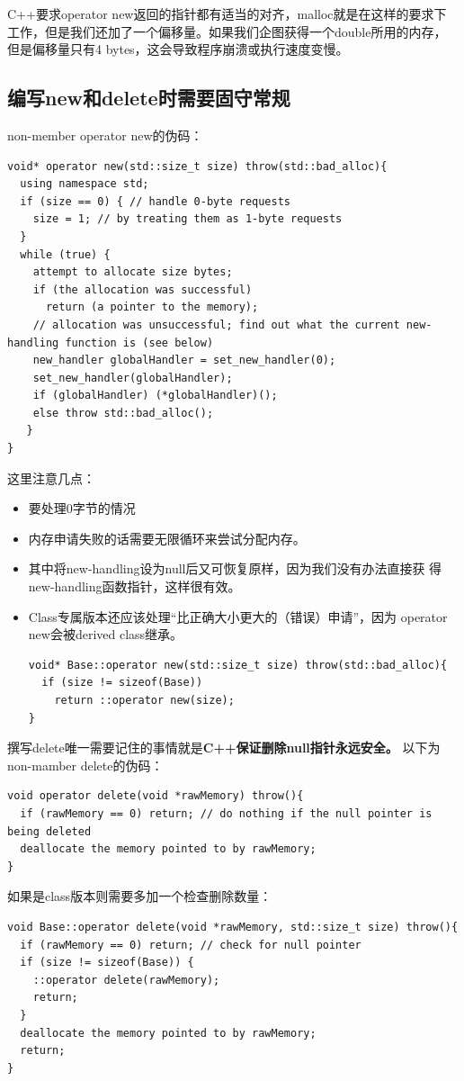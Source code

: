 \documentclass[a4paper,twoside]{article}
\theoremstyle{definition}
\theoremstyle{remark}
\numberwithin{equation}{section}
\begin{document}
C++要求operator new返回的指针都有适当的对齐，malloc就是在这样的要求下
工作，但是我们还加了一个偏移量。如果我们企图获得一个double所用的内存，
但是偏移量只有4 bytes，这会导致程序崩溃或执行速度变慢。

\subsection{编写new和delete时需要固守常规}
\label{sec:Item-51}

non-member operator new的伪码：
\begin{verbatim}
void* operator new(std::size_t size) throw(std::bad_alloc){
  using namespace std; 
  if (size == 0) { // handle 0-byte requests
    size = 1; // by treating them as 1-byte requests
  } 
  while (true) {
    attempt to allocate size bytes;
    if (the allocation was successful)
      return (a pointer to the memory);
    // allocation was unsuccessful; find out what the current new-handling function is (see below)
    new_handler globalHandler = set_new_handler(0);
    set_new_handler(globalHandler);
    if (globalHandler) (*globalHandler)();
    else throw std::bad_alloc();
   }
}
\end{verbatim}
这里注意几点：
\begin{itemize}
\item 要处理0字节的情况
\item 内存申请失败的话需要无限循环来尝试分配内存。
\item 其中将new-handling设为null后又可恢复原样，因为我们没有办法直接获
  得new-handling函数指针，这样很有效。
\item Class专属版本还应该处理“比正确大小更大的（错误）申请”，因为
  operator new会被derived class继承。
\begin{verbatim}
void* Base::operator new(std::size_t size) throw(std::bad_alloc){
  if (size != sizeof(Base))
    return ::operator new(size);
}
\end{verbatim}
\end{itemize}

撰写delete唯一需要记住的事情就是\textbf{C++保证删除null指针永远安全。}
以下为non-mamber delete的伪码：
\begin{verbatim}
void operator delete(void *rawMemory) throw(){
  if (rawMemory == 0) return; // do nothing if the null pointer is being deleted
  deallocate the memory pointed to by rawMemory;
}
\end{verbatim}

如果是class版本则需要多加一个检查删除数量：
\begin{verbatim}
void Base::operator delete(void *rawMemory, std::size_t size) throw(){
  if (rawMemory == 0) return; // check for null pointer
  if (size != sizeof(Base)) {
    ::operator delete(rawMemory); 
    return; 
  }
  deallocate the memory pointed to by rawMemory;
  return;
}
\end{verbatim}
\end{document}
